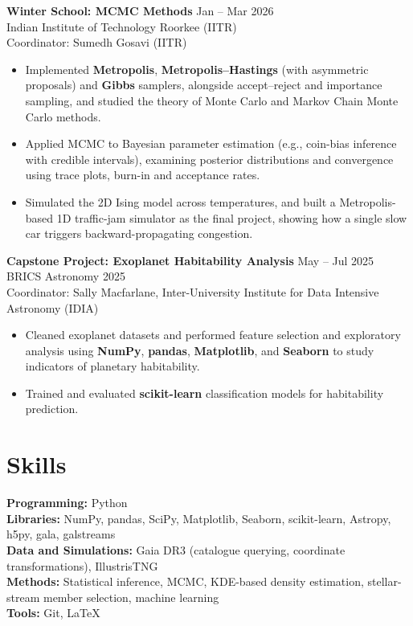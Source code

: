 \documentclass[11pt,a4paper]{article}
\begin{document}
\vspace{0.4cm}
 
\textbf{Winter School: MCMC Methods}
\hfill Jan -- Mar 2026 \\
Indian Institute of Technology Roorkee (IITR) \\
Coordinator: Sumedh Gosavi (IITR)
 
\begin{itemize}
\item Implemented \textbf{Metropolis}, \textbf{Metropolis--Hastings} (with asymmetric proposals) and \textbf{Gibbs} samplers, alongside accept--reject and importance sampling, and studied the theory of Monte Carlo and Markov Chain Monte Carlo methods.
\item Applied MCMC to Bayesian parameter estimation (e.g., coin-bias inference with credible intervals), examining posterior distributions and convergence using trace plots, burn-in and acceptance rates.
\item Simulated the 2D Ising model across temperatures, and built a Metropolis-based 1D traffic-jam simulator as the final project, showing how a single slow car triggers backward-propagating congestion.
\end{itemize}
 
\vspace{0.4cm}
 
\textbf{Capstone Project: Exoplanet Habitability Analysis}
\hfill May -- Jul 2025 \\
BRICS Astronomy 2025 \\
Coordinator: Sally Macfarlane, Inter-University Institute for Data Intensive Astronomy (IDIA)
 
\begin{itemize}
\item Cleaned exoplanet datasets and performed feature selection and exploratory analysis using \textbf{NumPy}, \textbf{pandas}, \textbf{Matplotlib}, and \textbf{Seaborn} to study indicators of planetary habitability.
\item Trained and evaluated \textbf{scikit-learn} classification models for habitability prediction.
\end{itemize}
 
\section*{Skills}
 
\textbf{Programming:} Python \\
\textbf{Libraries:} NumPy, pandas, SciPy, Matplotlib, Seaborn, scikit-learn, Astropy, h5py, gala, galstreams \\
\textbf{Data and Simulations:} Gaia DR3 (catalogue querying, coordinate transformations), IllustrisTNG \\
\textbf{Methods:} Statistical inference, MCMC, KDE-based density estimation, stellar-stream member selection, machine learning \\
\textbf{Tools:} Git, LaTeX
 
\end{document}
